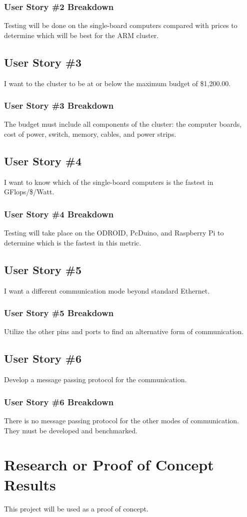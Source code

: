 \subsubsection{User Story \#2 Breakdown}
Testing will be done on the single-board computers compared with prices to determine which will be best for the ARM cluster.

\subsection{User Story \#3} 
I want to the cluster to be at or below the maximum budget of \$1,200.00.
\subsubsection{User Story \#3 Breakdown}
The budget must include all components of the cluster: the computer boards, cost of power, switch, memory, cables, and power strips.

\subsection{User Story \#4}
I want to know which of the single-board computers is the fastest in GFlops/\$/Watt.
\subsubsection{User Story \#4 Breakdown}
Testing will take place on the ODROID, PcDuino, and Raspberry Pi to determine which is the fastest in this metric. 

\subsection{User Story \#5} 
I want a different communication mode beyond standard Ethernet.
\subsubsection{User Story \#5 Breakdown}
Utilize the other pins and ports to find an alternative form of communication.

\subsection{User Story \#6} 
Develop a message passing protocol for the communication.
\subsubsection{User Story \#6 Breakdown}
There is no message passing protocol for the other modes of communication. They must be developed and benchmarked.

\section{Research or Proof of Concept Results}
This project will be used as a proof of concept.
